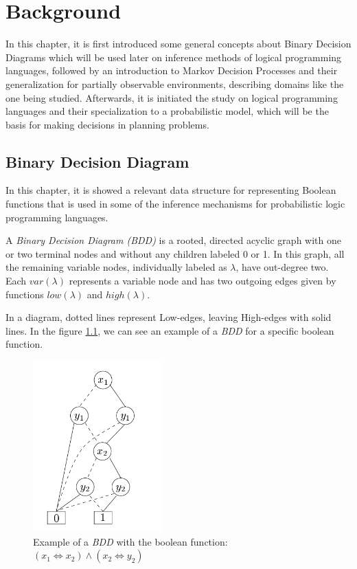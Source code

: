
\chapter{Background}
\label{chapter:background}

In this chapter, it is first introduced some general concepts about Binary
Decision Diagrams which will be used later on inference methods of logical
programming languages, followed by an introduction to Markov Decision Processes
and their generalization for partially observable environments, describing
domains like the one being studied. Afterwards, it is initiated the study on
logical programming languages and their specialization to a probabilistic model,
which will be the basis for making decisions in planning problems.

\section{Binary Decision Diagram}
In this chapter, it is showed a relevant data structure for representing Boolean
functions that is used in some of the inference mechanisms for probabilistic
logic programming languages.

A \textit{Binary Decision Diagram (BDD)} \cite{Andersen1999} is a rooted,
directed acyclic graph with one or two terminal nodes and without any children
labeled 0 or 1. In this graph, all the remaining variable nodes, individually
labeled as $\lambda$, have out-degree two. Each $var(\lambda)$ represents a
variable node and has two outgoing edges given by functions $low(\lambda)$ and
$high(\lambda)$.

In a diagram, dotted lines represent Low-edges, leaving High-edges with
solid lines. In the figure \ref{fig:bdd_grp}, we can see an example of a
\textit{BDD} for a specific boolean function.

\begin{figure}[H]
    \centering
        \includegraphics[width=5cm]{images/first_bdd}
        \caption{Example of a \textit{BDD} with the boolean function: $ (x_1
        \Leftrightarrow x_2) \wedge (x_2 \Leftrightarrow y_2) $
        \cite{Andersen1999} }
        \label{fig:bdd_grp}
\end{figure}

